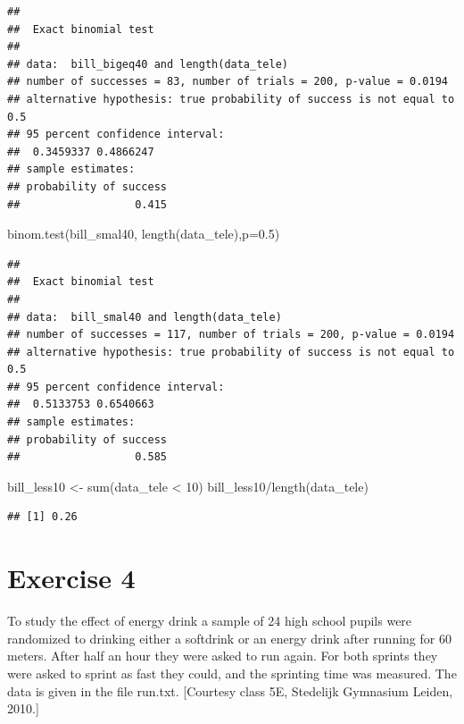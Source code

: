 \documentclass[
]{article}
\newenvironment{Shaded}{\begin{snugshade}}{\end{snugshade}}
\newcommand{\AttributeTok}[1]{\textcolor[rgb]{0.77,0.63,0.00}{#1}}
\newcommand{\DecValTok}[1]{\textcolor[rgb]{0.00,0.00,0.81}{#1}}
\newcommand{\FloatTok}[1]{\textcolor[rgb]{0.00,0.00,0.81}{#1}}
\newcommand{\FunctionTok}[1]{\textcolor[rgb]{0.00,0.00,0.00}{#1}}
\newcommand{\NormalTok}[1]{#1}
\newcommand{\OtherTok}[1]{\textcolor[rgb]{0.56,0.35,0.01}{#1}}
\newcommand{\SpecialCharTok}[1]{\textcolor[rgb]{0.00,0.00,0.00}{#1}}
\begin{document}
\begin{verbatim}
## 
##  Exact binomial test
## 
## data:  bill_bigeq40 and length(data_tele)
## number of successes = 83, number of trials = 200, p-value = 0.0194
## alternative hypothesis: true probability of success is not equal to 0.5
## 95 percent confidence interval:
##  0.3459337 0.4866247
## sample estimates:
## probability of success 
##                  0.415
\end{verbatim}

\begin{Shaded}
\begin{Highlighting}[]
\FunctionTok{binom.test}\NormalTok{(bill\_smal40, }\FunctionTok{length}\NormalTok{(data\_tele),}\AttributeTok{p=}\FloatTok{0.5}\NormalTok{)}
\end{Highlighting}
\end{Shaded}

\begin{verbatim}
## 
##  Exact binomial test
## 
## data:  bill_smal40 and length(data_tele)
## number of successes = 117, number of trials = 200, p-value = 0.0194
## alternative hypothesis: true probability of success is not equal to 0.5
## 95 percent confidence interval:
##  0.5133753 0.6540663
## sample estimates:
## probability of success 
##                  0.585
\end{verbatim}

\begin{Shaded}
\begin{Highlighting}[]
\NormalTok{bill\_less10 }\OtherTok{\textless{}{-}} \FunctionTok{sum}\NormalTok{(data\_tele }\SpecialCharTok{\textless{}} \DecValTok{10}\NormalTok{)}
\NormalTok{bill\_less10}\SpecialCharTok{/}\FunctionTok{length}\NormalTok{(data\_tele)}
\end{Highlighting}
\end{Shaded}

\begin{verbatim}
## [1] 0.26
\end{verbatim}

\hypertarget{exercise-4}{%
\section{Exercise 4}\label{exercise-4}}

To study the effect of energy drink a sample of 24 high school pupils
were randomized to drinking either a softdrink or an energy drink after
running for 60 meters. After half an hour they were asked to run again.
For both sprints they were asked to sprint as fast they could, and the
sprinting time was measured. The data is given in the file run.txt.
{[}Courtesy class 5E, Stedelijk Gymnasium Leiden, 2010.{]}
\end{document}

